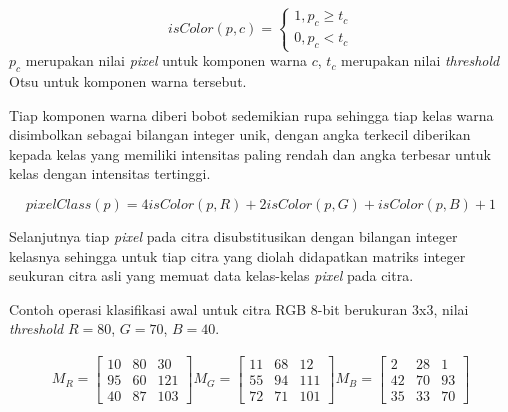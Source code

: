 \documentclass[laporan.tex]{subfiles}
\begin{document}
\begin{equation}
	isColor(p,c) = \begin{cases}
			1, p_c \geq t_c \\
			0, p_c < t_c
		\end{cases}
\end{equation}
$p_c$ merupakan nilai \emph{pixel} untuk komponen warna $c$, $t_c$ merupakan nilai \emph{threshold} Otsu untuk komponen warna tersebut.

Tiap komponen warna diberi bobot sedemikian rupa sehingga tiap kelas warna disimbolkan sebagai bilangan integer unik, dengan angka terkecil diberikan kepada kelas yang memiliki intensitas paling rendah dan angka terbesar untuk kelas dengan intensitas tertinggi.

\begin{equation}
	pixelClass(p) = 4 isColor(p,R) + 2 isColor(p,G) + isColor(p,B) + 1
\end{equation}

Selanjutnya tiap \emph{pixel} pada citra disubstitusikan dengan bilangan integer kelasnya sehingga untuk tiap citra yang diolah didapatkan matriks integer seukuran citra asli yang memuat data kelas-kelas \emph{pixel} pada citra.

Contoh operasi klasifikasi awal untuk citra RGB 8-bit berukuran 3x3, nilai \emph{threshold} $R=80$, $G=70$, $B=40$.

\begin{align*}
M_R = \begin{bmatrix}
10 & 80 & 30 \\
95 & 60 & 121 \\
40 & 87 & 103
\end{bmatrix} 
M_G = \begin{bmatrix}
11 & 68 & 12 \\
55 & 94 & 111 \\
72 & 71 & 101
\end{bmatrix} 
M_B = \begin{bmatrix}
2 & 28 & 1 \\
42 & 70 & 93 \\
35 & 33 & 70
\end{bmatrix}
\end{align*}
\end{document}
